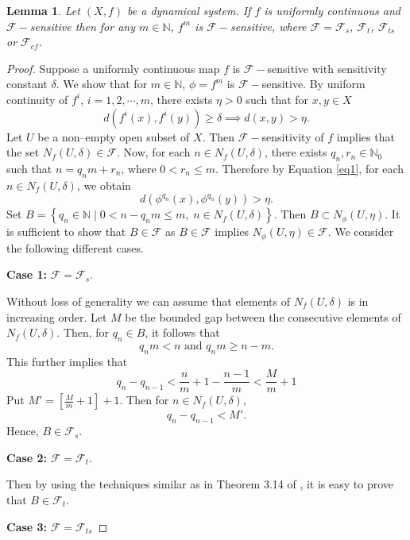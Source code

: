 \documentclass{amsart}[12pt, papera4]
\newtheorem{lemma}[theorem]{Lemma}
\theoremstyle{definition}
\theoremstyle{remark}
\numberwithin{equation}{section}
\def\N{{\mathbb N}}
\def\F{{\mathscr{F}}}
\begin{document}
\begin{lemma} \label{T6}
	Let $(X,f)$ be a dynamical system. If $f$ is uniformly continuous and $\F-$sensitive then for any $m\in \N$, $f^m$ is $\F-$sensitive, where $\F=\F_s$, $\F_t$, $\F_{ts}$ or $\F_{cf}$.
\end{lemma}
\begin{proof}
	\noindent Suppose a uniformly continuous map $f$ is $\F-$sensitive with sensitivity constant $\delta$. We show that for $m\in \N$, $\phi =f^m$ is $\F-$sensitive.  By uniform continuity of $f^i$, $i=1,2,\cdots,m$, there exists $\eta>0$ such that for $x,y\in X$
	\begin{equation} \label{eq1}
		d(f^i(x),f^i(y))\geq \delta \implies d(x,y)> \eta.
	\end{equation}
	Let $U$ be a non--empty open subset of $X$. Then $\F-$sensitivity of $f$ implies that the set $N_f(U,\delta)\in \F$. Now, for each $n\in N_f(U,\delta)$, there exists $q_n, r_n \in \mathbb{N}_0$ such that $n=q_nm+r_n$, where 
	$0< r_n \leq m$. Therefore by Equation \ref{eq1}, for each $n \in N_f(U, \delta)$, we obtain
	$$ d\left (\phi^{q_n}(x),\phi^{q_n}(y) \right )>\eta.$$
	Set $B=\left\{q_n \in \N  \; | \; 0 < n-q_n m \leq m, \; n\in N_f(U,\delta)\right\}$. Then $B \subset N_{\phi}(U, \eta)$. It is sufficient to show that $B\in \F$ as $B\in \F$ implies $N_{\phi}(U,\eta)\in \F$. We consider the following different cases. 
	
	\smallskip					
	\noindent \textbf{Case 1:} $\F=\F_s$. 
	
	\noindent Without loss of generality we can assume that elements of $N_f(U, \delta)$ is in increasing order. Let $M$ be the bounded gap between the consecutive elements of $N_f(U, \delta)$. Then, for $q_n \in B$, it follows that 				
	$$q_n m < n \mbox{ and } q_n m \geq n-m.$$
	This further implies that 
	$$q_n-q_{n-1}<\frac{\displaystyle{n}}{\displaystyle{m}}+1-\frac{\displaystyle{n-1}}{\displaystyle{m}}<\frac{\displaystyle{M}}{\displaystyle{m}}+1$$
	Put $M'=\left[\frac{\displaystyle{M}}{\displaystyle{m}}+1\right]+1$. Then for $n\in N_f(U, \delta)$, 				
	$$q_n-q_{n-1} < M'.$$ 
	Hence, $B\in \F_s$. 
	
	\smallskip			
	\noindent \textbf{Case 2:} $\F=\F_t$. 
	
	\noindent Then by using the techniques similar as in Theorem 3.14 of \cite{ES}, it is easy to prove that $B\in \F_t$.
	
	\smallskip
	\noindent \textbf{Case 3:} $\F=\F_{ts}$
	

\end{proof}
\end{document}
